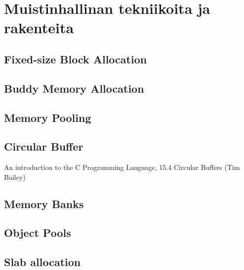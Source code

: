 \chapter{Muistinhallinan tekniikoita ja rakenteita} \label{Neljäs luku}

\section{Fixed-size Block Allocation}
\section{Buddy Memory Allocation}
\section{Memory Pooling}
\section{Circular Buffer}

An introduction to the C Programming Language, 15.4 Circular Buffers (Tim Bailey)

\section{Memory Banks}
\section{Object Pools}
\section{Slab allocation}